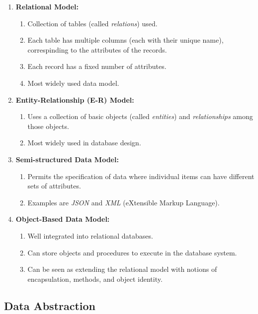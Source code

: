 \documentclass[journal,12pt,twocolumn]{IEEEtran}
\begin{document}
\begin{enumerate}
    \item \textbf{Relational Model:}
    \begin{enumerate}
        \item Collection of tables (called \textit{relations}) used.
        \item Each table has multiple columns (each with their unique name), 
        correspinding to the attributes of the records.
        \item Each record has a fixed number of attributes.
        \item Most widely used data model.
    \end{enumerate}

    \item \textbf{Entity-Relationship (E-R) Model:}
    \begin{enumerate}
        \item Uses a collection of basic objects (called \textit{entities}) and
        \textit{relationships} among those objects.
        \item Most widely used in database design.
    \end{enumerate}

    \item \textbf{Semi-structured Data Model:}
    \begin{enumerate}
        \item Permits the specification of data where individual items can have
        different sets of attributes.
        \item Examples are \textit{JSON} and \textit{XML} (eXtensible Markup
        Language).
    \end{enumerate}

    \item \textbf{Object-Based Data Model:}
    \begin{enumerate}
        \item Well integrated into relational databases.
        \item Can store objects and procedures to execute in the database system.
        \item Can be seen as extending the relational model with notions of 
        encapsulation, methods, and object identity.
    \end{enumerate}
\end{enumerate}

\subsection{Data Abstraction}
\end{document}
